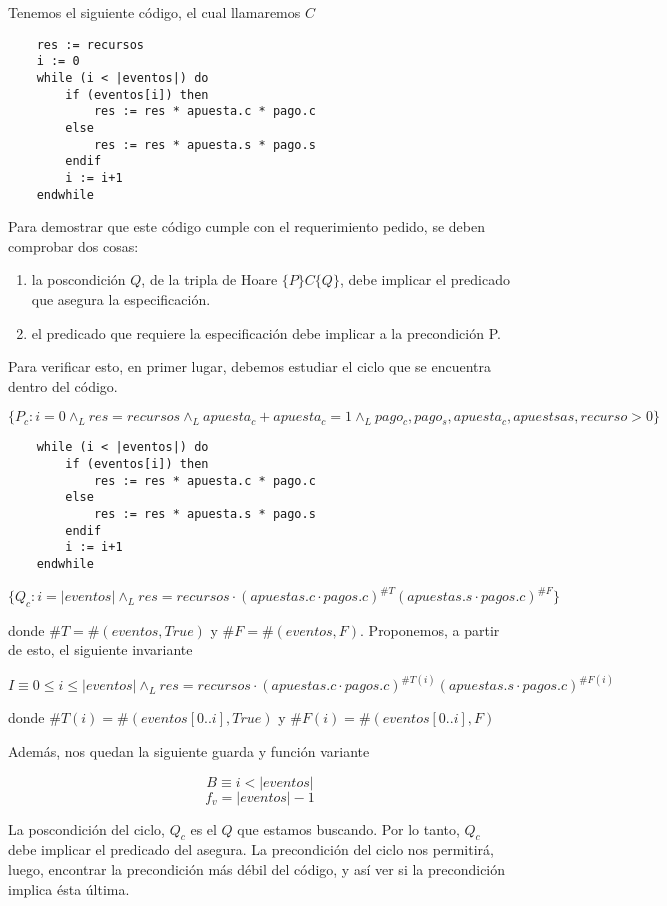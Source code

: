 \documentclass[../document.tex]{subfiles}
\begin{document}
Tenemos el siguiente código, el cual llamaremos $C$
\begin{verbatim}
    res := recursos
    i := 0
    while (i < |eventos|) do
        if (eventos[i]) then
            res := res * apuesta.c * pago.c
        else
            res := res * apuesta.s * pago.s
        endif
        i := i+1
    endwhile
\end{verbatim}

Para demostrar que este código cumple con el requerimiento pedido, se deben comprobar dos cosas:

\begin{enumerate}
    \item la poscondición $Q$, de la tripla de Hoare $\{P\}C\{Q\}$, debe implicar el predicado que asegura la especificación.
    \item el predicado que requiere la especificación debe implicar a la precondición {P}.
\end{enumerate}

Para verificar esto, en primer lugar, debemos estudiar el ciclo que se encuentra dentro del código.

$\{P_c: i = 0 \land_{L} res = recursos \land_{L} apuesta_{c}+apuesta_{c}=1 \land_{L} pago_{c},pago_{s},apuesta_{c},apuestsa{s},recurso>0\}$
\begin{verbatim}
    while (i < |eventos|) do
        if (eventos[i]) then
            res := res * apuesta.c * pago.c
        else
            res := res * apuesta.s * pago.s
        endif
        i := i+1
    endwhile
\end{verbatim}
$\{Q_c: i = |eventos| \land_{L} res = recursos \cdot (apuestas.c\cdot pagos.c)^{\#T}(apuestas.s\cdot pagos.c)^{\#F}\}$

donde $\#T = \#(eventos, True)$ y $\#F = \#(eventos, F)$. Proponemos, a partir de esto, el siguiente invariante

$$I \equiv 0\leq i \leq |eventos| \land_L res = recursos \cdot (apuestas.c\cdot pagos.c)^{\#T(i)}(apuestas.s\cdot pagos.c)^{\#F(i)}$$

donde $\#T(i) = \#(eventos[0..i], True)$ y $\#F(i) = \#(eventos[0..i], F)$

Además, nos quedan la siguiente guarda y función variante

$$B \equiv i < |eventos|$$
$$f_v = |eventos|-1$$

La poscondición del ciclo, $Q_c$ es el $Q$ que estamos buscando. Por lo tanto, $Q_c$ debe implicar el predicado del asegura. La precondición del ciclo nos permitirá, luego, encontrar la precondición más débil del código, y así ver si la precondición implica ésta última.
\end{document}

